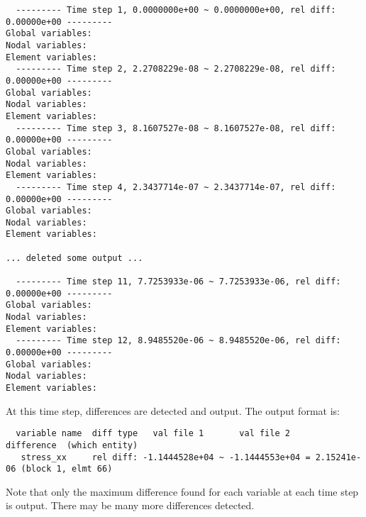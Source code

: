 \begin{verbatim}
  --------- Time step 1, 0.0000000e+00 ~ 0.0000000e+00, rel diff:  0.00000e+00 ---------
Global variables:
Nodal variables:
Element variables:
  --------- Time step 2, 2.2708229e-08 ~ 2.2708229e-08, rel diff:  0.00000e+00 ---------
Global variables:
Nodal variables:
Element variables:
  --------- Time step 3, 8.1607527e-08 ~ 8.1607527e-08, rel diff:  0.00000e+00 ---------
Global variables:
Nodal variables:
Element variables:
  --------- Time step 4, 2.3437714e-07 ~ 2.3437714e-07, rel diff:  0.00000e+00 ---------
Global variables:
Nodal variables:
Element variables:

... deleted some output ...

  --------- Time step 11, 7.7253933e-06 ~ 7.7253933e-06, rel diff:  0.00000e+00 ---------
Global variables:
Nodal variables:
Element variables:
  --------- Time step 12, 8.9485520e-06 ~ 8.9485520e-06, rel diff:  0.00000e+00 ---------
Global variables:
Nodal variables:
Element variables:
\end{verbatim}

\sectionline
At this time step, differences are detected and output.  The output
format is:

\begin{verbatim}
  variable name  diff type   val file 1       val file 2     difference  (which entity)
   stress_xx     rel diff: -1.1444528e+04 ~ -1.1444553e+04 = 2.15241e-06 (block 1, elmt 66)
\end{verbatim}

Note that only the maximum difference found for each variable at each
time step is output.  There may be many more differences detected.

